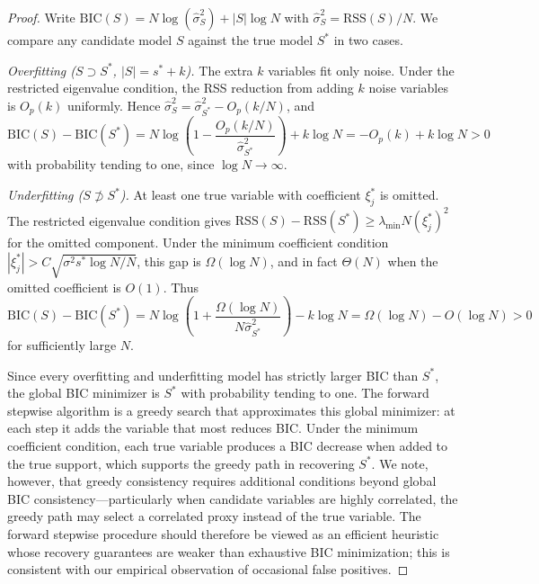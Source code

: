 \documentclass[preprint,12pt]{elsarticle}
\begin{document}
\begin{proof}
Write $\mathrm{BIC}(S) = N\log(\hat{\sigma}_S^2)+|S|\log N$ with $\hat{\sigma}_S^2=\mathrm{RSS}(S)/N$. We compare any candidate model $S$ against the true model $S^*$ in two cases.

\textit{Overfitting ($S\supset S^*$, $|S|=s^*+k$).} The extra $k$ variables fit only noise. Under the restricted eigenvalue condition, the RSS reduction from adding $k$ noise variables is $O_p(k)$ uniformly. Hence $\hat{\sigma}_S^2 = \hat{\sigma}_{S^*}^2 - O_p(k/N)$, and
\begin{equation}
\mathrm{BIC}(S)-\mathrm{BIC}(S^*) = N\log\!\left(1-\frac{O_p(k/N)}{\hat{\sigma}_{S^*}^2}\right)+k\log N = -O_p(k)+k\log N > 0
\end{equation}
with probability tending to one, since $\log N\to\infty$.

\textit{Underfitting ($S\not\supset S^*$).} At least one true variable with coefficient $\xi_j^*$ is omitted. The restricted eigenvalue condition gives $\mathrm{RSS}(S)-\mathrm{RSS}(S^*)\ge \lambda_{\min} N (\xi_j^*)^2$ for the omitted component. Under the minimum coefficient condition $|\xi_j^*|>C\sqrt{\sigma^2 s^*\log N/N}$, this gap is $\Omega(\log N)$, and in fact $\Theta(N)$ when the omitted coefficient is $O(1)$. Thus
\begin{equation}
\mathrm{BIC}(S)-\mathrm{BIC}(S^*) = N\log\!\left(1+\frac{\Omega(\log N)}{N\hat{\sigma}_{S^*}^2}\right)-k\log N = \Omega(\log N)-O(\log N)>0
\end{equation}
for sufficiently large $N$.

Since every overfitting and underfitting model has strictly larger BIC than $S^*$, the global BIC minimizer is $S^*$ with probability tending to one. The forward stepwise algorithm is a greedy search that approximates this global minimizer: at each step it adds the variable that most reduces BIC. Under the minimum coefficient condition, each true variable produces a BIC decrease when added to the true support, which supports the greedy path in recovering $S^*$. We note, however, that greedy consistency requires additional conditions beyond global BIC consistency---particularly when candidate variables are highly correlated, the greedy path may select a correlated proxy instead of the true variable. The forward stepwise procedure should therefore be viewed as an efficient heuristic whose recovery guarantees are weaker than exhaustive BIC minimization; this is consistent with our empirical observation of occasional false positives.
\end{proof}
\end{document}
